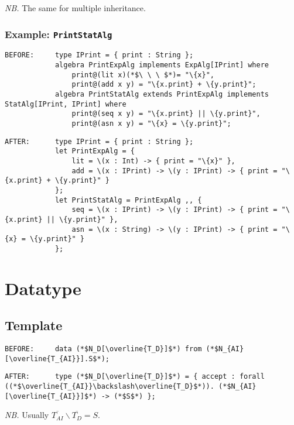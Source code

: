 \documentclass{article}
\newcommand{\nb}{\textit{NB. }}
\begin{document}
\begin{spacing}{1.1}
\nb The same for multiple inheritance.

\subsubsection{Example: \lstinline{PrintStatAlg}}

\begin{lstlisting}[numbers=none]
BEFORE:     type IPrint = { print : String };
            algebra PrintExpAlg implements ExpAlg[IPrint] where
                print@(lit x)(*$\ \ \ $*)= "\{x}",
                print@(add x y) = "\{x.print} + \{y.print}";
            algebra PrintStatAlg extends PrintExpAlg implements StatAlg[IPrint, IPrint] where
                print@(seq x y) = "\{x.print} || \{y.print}",
                print@(asn x y) = "\{x} = \{y.print}";
\end{lstlisting}
\begin{lstlisting}[numbers=none]
AFTER:      type IPrint = { print : String };
            let PrintExpAlg = {
                lit = \(x : Int) -> { print = "\{x}" },
                add = \(x : IPrint) -> \(y : IPrint) -> { print = "\{x.print} + \{y.print}" }
            };
            let PrintStatAlg = PrintExpAlg ,, {
                seq = \(x : IPrint) -> \(y : IPrint) -> { print = "\{x.print} || \{y.print}" },
                asn = \(x : String) -> \(y : IPrint) -> { print = "\{x} = \{y.print}" }
            };
\end{lstlisting}

\section{Datatype}

\subsection{Template}

\begin{lstlisting}[numbers=none]
BEFORE:     data (*$N_D[\overline{T_D}]$*) from (*$N_{AI}[\overline{T_{AI}}].S$*);
\end{lstlisting}
\begin{lstlisting}[numbers=none]
AFTER:      type (*$N_D[\overline{T_D}]$*) = { accept : forall ((*$\overline{T_{AI}}\backslash\overline{T_D}$*)). (*$N_{AI}[\overline{T_{AI}}]$*) -> (*$S$*) };
\end{lstlisting}

\nb Usually $\overline{T_{AI}}\backslash\overline{T_D}=S$.


\end{spacing}
\end{document}
